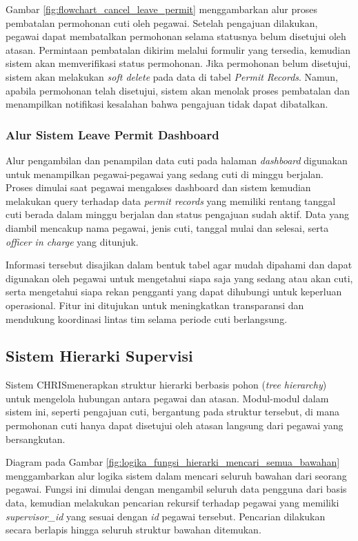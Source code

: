 Gambar \ref{fig:flowchart_cancel_leave_permit} menggambarkan alur proses pembatalan permohonan cuti oleh pegawai. Setelah pengajuan dilakukan, pegawai dapat membatalkan permohonan selama statusnya belum disetujui oleh atasan. Permintaan pembatalan dikirim melalui formulir yang tersedia, kemudian sistem akan memverifikasi status permohonan. Jika permohonan belum disetujui, sistem akan melakukan \textit{soft delete} pada data di tabel \textit{Permit Records}. Namun, apabila permohonan telah disetujui, sistem akan menolak proses pembatalan dan menampilkan notifikasi kesalahan bahwa pengajuan tidak dapat dibatalkan.

\subsubsection{Alur Sistem Leave Permit Dashboard}
Alur pengambilan dan penampilan data cuti pada halaman \textit{dashboard} digunakan untuk menampilkan pegawai-pegawai yang sedang cuti di minggu berjalan. Proses dimulai saat pegawai mengakses dashboard dan sistem kemudian melakukan query terhadap data \textit{permit records} yang memiliki rentang tanggal cuti berada dalam minggu berjalan dan status pengajuan sudah aktif. Data yang diambil mencakup nama pegawai, jenis cuti, tanggal mulai dan selesai, serta \textit{officer in charge} yang ditunjuk.

Informasi tersebut disajikan dalam bentuk tabel agar mudah dipahami dan dapat digunakan oleh pegawai untuk mengetahui siapa saja yang sedang atau akan cuti, serta mengetahui siapa rekan pengganti yang dapat dihubungi untuk keperluan operasional. Fitur ini ditujukan untuk meningkatkan transparansi dan mendukung koordinasi lintas tim selama periode cuti berlangsung.


\subsection{Sistem Hierarki Supervisi}
Sistem CHRIS\@ menerapkan struktur hierarki berbasis pohon (\textit{tree hierarchy}) untuk mengelola hubungan antara pegawai dan atasan. Modul-modul dalam sistem ini, seperti pengajuan cuti, bergantung pada struktur tersebut, di mana permohonan cuti hanya dapat disetujui oleh atasan langsung dari pegawai yang bersangkutan.

Diagram pada Gambar \ref{fig:logika_fungsi_hierarki_mencari_semua_bawahan} menggambarkan alur logika sistem dalam mencari seluruh bawahan dari seorang pegawai. Fungsi ini dimulai dengan mengambil seluruh data pengguna dari basis data, kemudian melakukan pencarian rekursif terhadap pegawai yang memiliki \textit{supervisor\_id} yang sesuai dengan \textit{id} pegawai tersebut. Pencarian dilakukan secara berlapis hingga seluruh struktur bawahan ditemukan.

